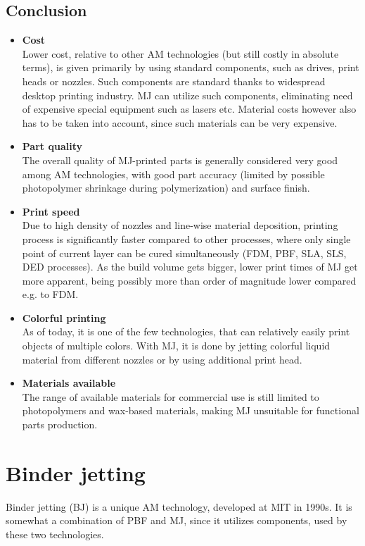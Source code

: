 \documentclass[a4paper, 11pt, reqno]{report}
\newcommand\pro{\item[$+$]}
\newcommand\con{\item[$-$]}
\begin{document}
\section{Conclusion}
\begin{itemize}
\pro \textbf{Cost}\\
Lower cost, relative to other AM technologies (but still costly in absolute terms), is given primarily by using standard components, such as drives, print heads or nozzles. Such components are standard thanks to widespread desktop printing industry. MJ can utilize such components, eliminating need of expensive special equipment such as lasers etc. Material costs however also has to be taken into account, since such materials can be very expensive.

\pro \textbf{Part quality}\\
The overall quality of MJ-printed parts is generally considered very good among AM technologies, with good part accuracy (limited by possible photopolymer shrinkage during polymerization) and surface finish.

\pro \textbf{Print speed}\\
Due to high density of nozzles and line-wise material deposition, printing process is significantly faster compared to other processes, where only single point of current layer can be cured simultaneously (FDM, PBF, SLA, SLS, DED processes). As the build volume gets bigger, lower print times of MJ get more apparent, being possibly more than order of magnitude lower compared e.g. to FDM.

\pro \textbf{Colorful printing}\\
As of today, it is one of the few technologies, that can relatively easily print objects of multiple colors. With MJ, it is done by jetting colorful liquid material from different nozzles or by using additional print head.
\\[10pt]

\con \textbf{Materials available}\\
The range of available materials for commercial use is still limited to photopolymers and wax-based materials, making MJ unsuitable for functional parts production.
\end{itemize}

\chapter{Binder jetting}
Binder jetting (BJ) is a unique AM technology, developed at MIT in 1990s. It is somewhat a combination of PBF and MJ, since it utilizes components, used by these two technologies. 
\end{document}
